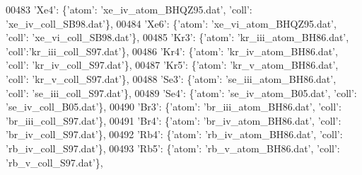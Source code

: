 \begin{DoxyCode}
00483                              \textcolor{stringliteral}{'Xe4'}: \{\textcolor{stringliteral}{'atom'}: \textcolor{stringliteral}{'xe\_iv\_atom\_BHQZ95.dat'}, \textcolor{stringliteral}{'coll'}: \textcolor{stringliteral}{'xe\_iv\_coll\_SB98.dat'}\},
00484                              \textcolor{stringliteral}{'Xe6'}: \{\textcolor{stringliteral}{'atom'}: \textcolor{stringliteral}{'xe\_vi\_atom\_BHQZ95.dat'}, \textcolor{stringliteral}{'coll'}: \textcolor{stringliteral}{'xe\_vi\_coll\_SB98.dat'}\},
00485                              \textcolor{stringliteral}{'Kr3'}: \{\textcolor{stringliteral}{'atom'}: \textcolor{stringliteral}{'kr\_iii\_atom\_BH86.dat'}, \textcolor{stringliteral}{'coll'}:\textcolor{stringliteral}{'kr\_iii\_coll\_S97.dat'}\},
00486                              \textcolor{stringliteral}{'Kr4'}: \{\textcolor{stringliteral}{'atom'}: \textcolor{stringliteral}{'kr\_iv\_atom\_BH86.dat'}, \textcolor{stringliteral}{'coll'}: \textcolor{stringliteral}{'kr\_iv\_coll\_S97.dat'}\},
00487                              \textcolor{stringliteral}{'Kr5'}: \{\textcolor{stringliteral}{'atom'}: \textcolor{stringliteral}{'kr\_v\_atom\_BH86.dat'}, \textcolor{stringliteral}{'coll'}: \textcolor{stringliteral}{'kr\_v\_coll\_S97.dat'}\},
00488                              \textcolor{stringliteral}{'Se3'}: \{\textcolor{stringliteral}{'atom'}: \textcolor{stringliteral}{'se\_iii\_atom\_BH86.dat'}, \textcolor{stringliteral}{'coll'}: \textcolor{stringliteral}{'se\_iii\_coll\_S97.dat'}\},
00489                              \textcolor{stringliteral}{'Se4'}: \{\textcolor{stringliteral}{'atom'}: \textcolor{stringliteral}{'se\_iv\_atom\_B05.dat'}, \textcolor{stringliteral}{'coll'}: \textcolor{stringliteral}{'se\_iv\_coll\_B05.dat'}\},
00490                              \textcolor{stringliteral}{'Br3'}: \{\textcolor{stringliteral}{'atom'}: \textcolor{stringliteral}{'br\_iii\_atom\_BH86.dat'}, \textcolor{stringliteral}{'coll'}: \textcolor{stringliteral}{'br\_iii\_coll\_S97.dat'}\},
00491                              \textcolor{stringliteral}{'Br4'}: \{\textcolor{stringliteral}{'atom'}: \textcolor{stringliteral}{'br\_iv\_atom\_BH86.dat'}, \textcolor{stringliteral}{'coll'}: \textcolor{stringliteral}{'br\_iv\_coll\_S97.dat'}\},
00492                              \textcolor{stringliteral}{'Rb4'}: \{\textcolor{stringliteral}{'atom'}: \textcolor{stringliteral}{'rb\_iv\_atom\_BH86.dat'}, \textcolor{stringliteral}{'coll'}: \textcolor{stringliteral}{'rb\_iv\_coll\_S97.dat'}\},
00493                              \textcolor{stringliteral}{'Rb5'}: \{\textcolor{stringliteral}{'atom'}: \textcolor{stringliteral}{'rb\_v\_atom\_BH86.dat'}, \textcolor{stringliteral}{'coll'}: \textcolor{stringliteral}{'rb\_v\_coll\_S97.dat'}\},

\end{DoxyCode}
